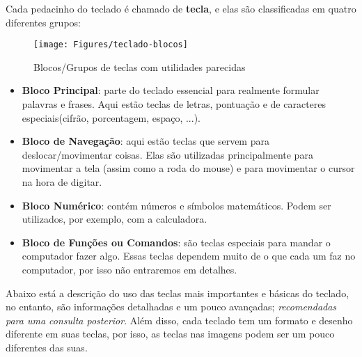 \documentclass[hidelinks,12pt]{article}
\begin{document}
Cada pedacinho do teclado é chamado de \textbf{tecla}, e elas são classificadas em quatro diferentes grupos:

\begin{figure}[!h]
        \centering
		\texttt{[image: Figures/teclado-blocos]}
		\label{fig:teclado-blocos}
		\caption{Blocos/Grupos de teclas com utilidades parecidas}
\end{figure}



\begin{itemize}
	
		\item \textbf{Bloco Principal}: parte do teclado essencial para realmente formular palavras e frases. Aqui estão teclas de letras, pontuação e de caracteres especiais(cifrão, porcentagem, espaço, ...).
		
		\item \textbf{Bloco de Navegação}: aqui estão teclas que servem para deslocar/movimentar coisas. Elas são utilizadas principalmente para movimentar a tela (assim como a roda do mouse) e para movimentar o cursor na hora de digitar.
		
		\item \textbf{Bloco Numérico}: contém números e símbolos matemáticos. Podem ser utilizados, por exemplo, com a calculadora.
		
		\item \textbf{Bloco de Funções ou Comandos}: são teclas especiais para mandar o computador fazer algo. Essas teclas dependem muito de o que cada um faz no computador, por isso não entraremos em detalhes.
		
\end{itemize}	


Abaixo está a descrição do uso das teclas mais importantes e básicas do teclado, no entanto, são informações detalhadas e um pouco avançadas; \emph{recomendadas para uma consulta posterior}. Além disso, cada teclado tem um formato e desenho diferente em suas teclas, por isso, as teclas nas imagens podem ser um pouco diferentes das suas.
\end{document}
